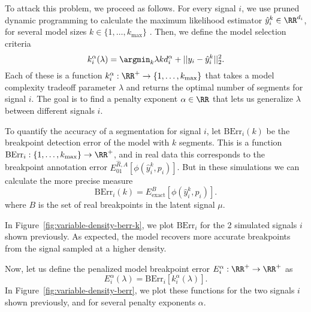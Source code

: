 \documentclass{article}
\begin{document}
To attack this problem, we proceed as follows. For every signal $i$,
we use pruned dynamic programming to calculate the maximum likelihood
estimator $\hat y^k_i\in\RR^{d_i}$, for several model sizes
$k\in\{1,\dots,k_{\text{max}}\}$ \citep{pruned-dp}. Then, we define
the model selection criteria
\begin{equation}
  \label{eq:kstar_density}
  k^\alpha_i(\lambda) =\argmin_k \lambda k d_i^\alpha + 
  ||y_i-\hat y^k_i||_2^2.
\end{equation}
Each of these is a function $k_i^\alpha:\RR^+\rightarrow
\{1,\dots,k_{\text{max}}\}$ that takes a model complexity tradeoff
parameter $\lambda$ and returns the optimal number of segments for
signal $i$. The goal is to find a penalty exponent $\alpha\in\RR$ that
lets us generalize $\lambda$ between different signals $i$.


To quantify the accuracy of a segmentation for signal $i$, let
$\text{BErr}_i(k)$ be the breakpoint detection error of the model with
$k$ segments. This is a function
$\text{BErr}_i:\{1,\dots,k_{\text{max}}\}\rightarrow\RR^+$, and in
real data this corresponds to the breakpoint annotation error
$E_{01}^{\hat R,A}\left[\phi(\hat y^k_i,p_i)\right]$. But in
these simulations we can calculate the more precise measure
\begin{equation}
  \label{eq:berr}
  \text{BErr}_i(k) = E_{\text{exact}}^{B}\left[
\phi(\hat y_i^k,p_i)
\right].
\end{equation}
where $B$ is the set of real breakpoints in the latent
signal $\mu$.

In Figure~\ref{fig:variable-density-berr-k}, we plot $\text{BErr}_i$
for the 2 simulated signals $i$ shown previously.  As expected, the
model recovers more accurate breakpoints from the signal sampled at a
higher density.  


\newpage

Now, let us define the penalized
model breakpoint error $E^\alpha_i:\RR^+\rightarrow\RR^+$ as
\begin{equation}
  \label{eq:lerr}
E^\alpha_i(\lambda) = \text{BErr}_i\left[
k^\alpha_i(\lambda)
\right].
\end{equation}
In Figure~\ref{fig:variable-density-berr}, we plot these functions for the
two signals $i$ shown previously, and for several penalty exponents $\alpha$.
\end{document}
